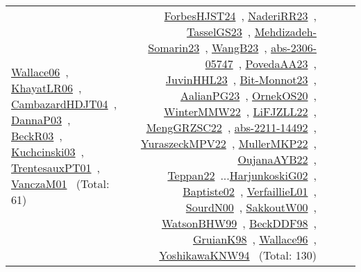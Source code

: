 {\begin{longtable}{p{3cm}r>{\raggedright\arraybackslash}p{6cm}>{\raggedright\arraybackslash}p{6cm}>{\raggedright\arraybackslash}p{8cm}}
\href{../works/Wallace06.pdf}{Wallace06}~\cite{Wallace06}, \href{../works/KhayatLR06.pdf}{KhayatLR06}~\cite{KhayatLR06}, \href{../works/CambazardHDJT04.pdf}{CambazardHDJT04}~\cite{CambazardHDJT04}, \href{../works/DannaP03.pdf}{DannaP03}~\cite{DannaP03}, \href{../works/BeckR03.pdf}{BeckR03}~\cite{BeckR03}, \href{../works/Kuchcinski03.pdf}{Kuchcinski03}~\cite{Kuchcinski03}, \href{../works/TrentesauxPT01.pdf}{TrentesauxPT01}~\cite{TrentesauxPT01}, \href{../works/VanczaM01.pdf}{VanczaM01}~\cite{VanczaM01} (Total: 61) & \href{../works/ForbesHJST24.pdf}{ForbesHJST24}~\cite{ForbesHJST24}, \href{../works/NaderiRR23.pdf}{NaderiRR23}~\cite{NaderiRR23}, \href{../works/TasselGS23.pdf}{TasselGS23}~\cite{TasselGS23}, \href{../works/Mehdizadeh-Somarin23.pdf}{Mehdizadeh-Somarin23}~\cite{Mehdizadeh-Somarin23}, \href{../works/WangB23.pdf}{WangB23}~\cite{WangB23}, \href{../works/abs-2306-05747.pdf}{abs-2306-05747}~\cite{abs-2306-05747}, \href{../works/PovedaAA23.pdf}{PovedaAA23}~\cite{PovedaAA23}, \href{../works/JuvinHHL23.pdf}{JuvinHHL23}~\cite{JuvinHHL23}, \href{../works/Bit-Monnot23.pdf}{Bit-Monnot23}~\cite{Bit-Monnot23}, \href{../works/AalianPG23.pdf}{AalianPG23}~\cite{AalianPG23}, \href{../works/OrnekOS20.pdf}{OrnekOS20}~\cite{OrnekOS20}, \href{../works/WinterMMW22.pdf}{WinterMMW22}~\cite{WinterMMW22}, \href{../works/LiFJZLL22.pdf}{LiFJZLL22}~\cite{LiFJZLL22}, \href{../works/MengGRZSC22.pdf}{MengGRZSC22}~\cite{MengGRZSC22}, \href{../works/abs-2211-14492.pdf}{abs-2211-14492}~\cite{abs-2211-14492}, \href{../works/YuraszeckMPV22.pdf}{YuraszeckMPV22}~\cite{YuraszeckMPV22}, \href{../works/MullerMKP22.pdf}{MullerMKP22}~\cite{MullerMKP22}, \href{../works/OujanaAYB22.pdf}{OujanaAYB22}~\cite{OujanaAYB22}, \href{../works/Teppan22.pdf}{Teppan22}~\cite{Teppan22}...\href{../works/HarjunkoskiG02.pdf}{HarjunkoskiG02}~\cite{HarjunkoskiG02}, \href{../works/Baptiste02.pdf}{Baptiste02}~\cite{Baptiste02}, \href{../works/VerfaillieL01.pdf}{VerfaillieL01}~\cite{VerfaillieL01}, \href{../works/SourdN00.pdf}{SourdN00}~\cite{SourdN00}, \href{../works/SakkoutW00.pdf}{SakkoutW00}~\cite{SakkoutW00}, \href{../works/WatsonBHW99.pdf}{WatsonBHW99}~\cite{WatsonBHW99}, \href{../works/BeckDDF98.pdf}{BeckDDF98}~\cite{BeckDDF98}, \href{../works/GruianK98.pdf}{GruianK98}~\cite{GruianK98}, \href{../works/Wallace96.pdf}{Wallace96}~\cite{Wallace96}, \href{../works/YoshikawaKNW94.pdf}{YoshikawaKNW94}~\cite{YoshikawaKNW94} (Total: 130)\\

\end{longtable}}
